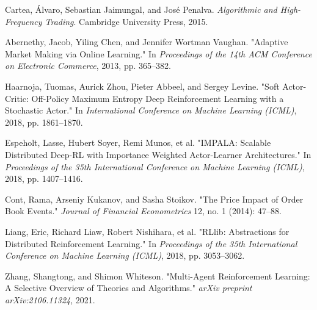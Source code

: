 \begin{thebibliography}{9}

Cartea, Álvaro, Sebastian Jaimungal, and José Penalva. \textit{Algorithmic and High-Frequency Trading}. Cambridge University Press, 2015.

Abernethy, Jacob, Yiling Chen, and Jennifer Wortman Vaughan. "Adaptive Market Making via Online Learning." In \textit{Proceedings of the 14th ACM Conference on Electronic Commerce}, 2013, pp. 365--382.

Haarnoja, Tuomas, Aurick Zhou, Pieter Abbeel, and Sergey Levine. "Soft Actor-Critic: Off-Policy Maximum Entropy Deep Reinforcement Learning with a Stochastic Actor." In \textit{International Conference on Machine Learning (ICML)}, 2018, pp. 1861--1870.

Espeholt, Lasse, Hubert Soyer, Remi Munos, et al. "IMPALA: Scalable Distributed Deep-RL with Importance Weighted Actor-Learner Architectures." In \textit{Proceedings of the 35th International Conference on Machine Learning (ICML)}, 2018, pp. 1407--1416.

Cont, Rama, Arseniy Kukanov, and Sasha Stoikov. "The Price Impact of Order Book Events." \textit{Journal of Financial Econometrics} 12, no. 1 (2014): 47--88.

Liang, Eric, Richard Liaw, Robert Nishihara, et al. "RLlib: Abstractions for Distributed Reinforcement Learning." In \textit{Proceedings of the 35th International Conference on Machine Learning (ICML)}, 2018, pp. 3053--3062.

Zhang, Shangtong, and Shimon Whiteson. "Multi-Agent Reinforcement Learning: A Selective Overview of Theories and Algorithms." \textit{arXiv preprint arXiv:2106.11324}, 2021.

\end{thebibliography}